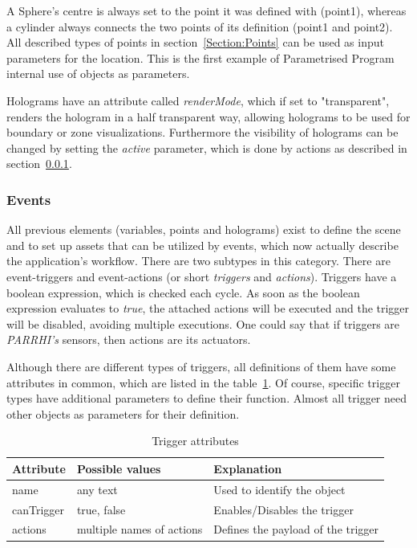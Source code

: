 A Sphere's centre is always set to the point it was defined with (point1), whereas a cylinder always connects the two points of its definition (point1 and point2). All described types of points in section~\ref{Section:Points} can be used as input parameters for the location. This is the first example of Parametrised Program internal use of objects as parameters.

Holograms have an attribute called \textit{renderMode}, which if set to "transparent", renders the hologram in a half transparent way, allowing holograms to be used for boundary or zone visualizations. Furthermore the visibility of holograms can be changed by setting the \textit{active} parameter, which is done by actions as described in section~\ref{Section:Events}.

\subsubsection{Events}\label{Section:Events}
All previous elements (variables, points and holograms) exist to define the scene and to set up assets that can be utilized by events, which now actually describe the application's workflow. There are two subtypes in this category. There are event-triggers and event-actions (or short \textit{triggers} and \textit{actions}). Triggers have a boolean expression, which is checked each cycle. As soon as the boolean expression evaluates to \textit{true}, the attached actions will be executed and the trigger will be disabled, avoiding multiple executions. One could say that if triggers are \textit{PARRHI's} sensors, then actions are its actuators.

Although there are different types of triggers, all definitions of them have some attributes in common, which are listed in the table~\ref{Table:TriggerAttributes}. Of course, specific trigger types have additional parameters to define their function. Almost all trigger need other objects as parameters for their definition.

 \begin{table}[!h]
 	\caption{Trigger attributes}
 	\label{Table:TriggerAttributes}
 	\centering
 	\begin{tabular}{lll}
 		\toprule
 		Attribute & Possible values		& Explanation	\\		
 		\midrule
 		name & any text & Used to identify the object \\
 		canTrigger & true, false		& Enables/Disables the trigger \\
 		actions & multiple names of actions & Defines the payload of the trigger \\
 		\bottomrule
 	\end{tabular}
 \end{table}

